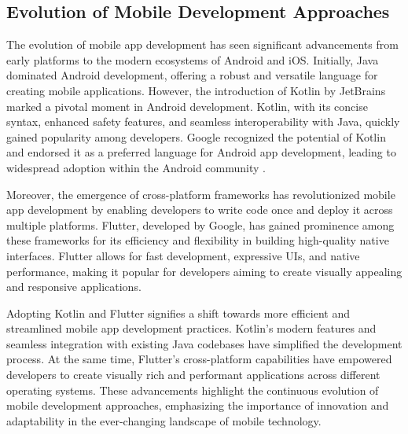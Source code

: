\subsection{Evolution of Mobile Development Approaches}
The evolution of mobile app development has seen significant advancements from early platforms to the modern ecosystems of Android and iOS. Initially, Java dominated Android development, offering a robust and versatile language for creating mobile applications. However, the introduction of Kotlin by JetBrains marked a pivotal moment in Android development. Kotlin, with its concise syntax, enhanced safety features, and seamless interoperability with Java, quickly gained popularity among developers. Google recognized the potential of Kotlin and endorsed it as a preferred language for Android app development, leading to widespread adoption within the Android community \cite{zhang2023entertainment}.
\par
Moreover, the emergence of cross-platform frameworks has revolutionized mobile app development by enabling developers to write code once and deploy it across multiple platforms. Flutter, developed by Google, has gained prominence among these frameworks for its efficiency and flexibility in building high-quality native interfaces. Flutter allows for fast development, expressive UIs, and native performance, making it popular for developers aiming to create visually appealing and responsive applications.
\par
Adopting Kotlin and Flutter signifies a shift towards more efficient and streamlined mobile app development practices. Kotlin's modern features and seamless integration with existing Java codebases have simplified the development process. At the same time, Flutter's cross-platform capabilities have empowered developers to create visually rich and performant applications across different operating systems. These advancements highlight the continuous evolution of mobile development approaches, emphasizing the importance of innovation and adaptability in the ever-changing landscape of mobile technology.
